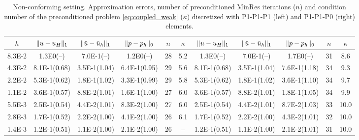 \documentclass[r]{siamart171218}
\begin{document}
\begin{table}
  \begin{center}
    \scriptsize{
  \begin{tabular}{c|ccc|c|c||ccc|c|c}
    \hline
    $h$ & $\lVert{u-u_H}\rVert_1$ & $\lVert{\hat{u}-\hat{u}_h}\rVert_1$ & $\lVert{p-p_h}\rVert_0$ & $n$ & $\kappa$
        & $\lVert{u-u_H}\rVert_1$ & $\lVert{\hat{u}-\hat{u}_h}\rVert_1$ & $\lVert{p-p_h}\rVert_0$ & $n$ & $\kappa$ \\
    \hline
8.3E-2 & 1.3E0(--)    & 7.0E-1(--)   & 1.2E0(--)    & 28 & 5.2 & 1.3E0(--)    & 7.0E-1(--)   & 1.7E0(--)     & 31 & 8.6\\   
4.3E-2 & 8.1E-1(0.68) & 3.5E-1(1.04) & 6.4E-1(0.95) & 29 & 5.6 & 8.1E-1(0.68) & 3.5E-1(1.04) & 7.6E-1(1.18)  & 34 & 9.3\\ 
2.2E-2 & 5.3E-1(0.62) & 1.8E-1(1.02) & 3.3E-1(0.99) & 29 & 5.8 & 5.3E-1(0.62) & 1.8E-1(1.02) & 3.6E-1(1.10)  & 34 & 9.7\\ 
1.1E-2 & 3.6E-1(0.57) & 8.8E-2(1.01) & 1.6E-1(1.00) & 27 & 6.0 & 3.6E-1(0.57) & 8.8E-2(1.01) & 1.8E-1(1.05)  & 34 & 9.9\\ 
5.5E-3 & 2.5E-1(0.54) & 4.4E-2(1.01) & 8.3E-2(1.00) & 27 & 6.0 & 2.5E-1(0.54) & 4.4E-2(1.01) & 8.7E-2(1.03)  & 33 & 10.0\\
2.8E-3 & 1.7E-1(0.52) & 2.2E-2(1.00) & 4.1E-2(1.00) & 26 & 6.1 & 1.7E-1(0.52) & 2.2E-2(1.00) & 4.3E-2(1.01)  & 32 & 10.0\\
1.4E-3 & 1.2E-1(0.51) & 1.1E-2(1.00) & 2.1E-2(1.00) & 26 & --  & 1.2E-1(0.51) & 1.1E-2(1.00) & 2.1E-2(1.01)  & 31 & 10.0\\
    \hline
  \end{tabular}
    }
    \caption{Non-conforming setting. Approximation errors, number of preconditioned MinRes iterations ($n$) and
      condition number of the preconditioned problem \eqref{eq:coupled_weak} ($\kappa$) discretized
      with P1-P1-P1 (left) and P1-P1-P0 (right) elements.}
  \label{tab:coupled_non}
  \end{center}
\end{table}




\end{document}

